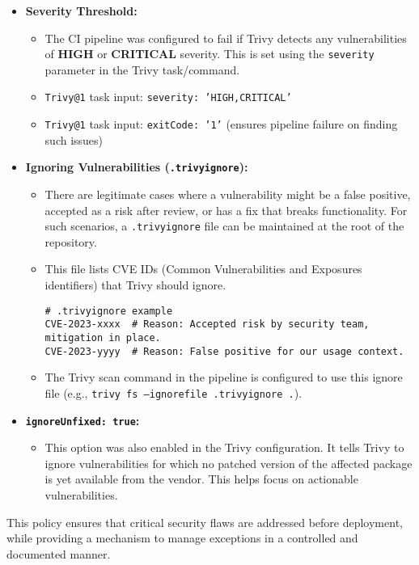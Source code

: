 \begin{itemize}
    \item \textbf{Severity Threshold:}
    \begin{itemize}
        \item The CI pipeline was configured to fail if Trivy detects any vulnerabilities of \textbf{HIGH} or \textbf{CRITICAL} severity. This is set using the \texttt{severity} parameter in the Trivy task/command.
        \item \texttt{Trivy@1} task input: \texttt{severity: 'HIGH,CRITICAL'}
        \item \texttt{Trivy@1} task input: \texttt{exitCode: '1'} (ensures pipeline failure on finding such issues)
    \end{itemize}
    \item \textbf{Ignoring Vulnerabilities (\texttt{.trivyignore}):}
    \begin{itemize}
        \item There are legitimate cases where a vulnerability might be a false positive, accepted as a risk after review, or has a fix that breaks functionality. For such scenarios, a \texttt{.trivyignore} file can be maintained at the root of the repository.
        \item This file lists CVE IDs (Common Vulnerabilities and Exposures identifiers) that Trivy should ignore.
\begin{verbatim}
# .trivyignore example
CVE-2023-xxxx  # Reason: Accepted risk by security team, mitigation in place.
CVE-2023-yyyy  # Reason: False positive for our usage context.
\end{verbatim}
        \item The Trivy scan command in the pipeline is configured to use this ignore file (e.g., \texttt{trivy fs --ignorefile .trivyignore .}).
    \end{itemize}
    \item \textbf{\texttt{ignoreUnfixed: true}:}
    \begin{itemize}
        \item This option was also enabled in the Trivy configuration. It tells Trivy to ignore vulnerabilities for which no patched version of the affected package is yet available from the vendor. This helps focus on actionable vulnerabilities.
    \end{itemize}
\end{itemize}

This policy ensures that critical security flaws are addressed before deployment, while providing a mechanism to manage exceptions in a controlled and documented manner.

